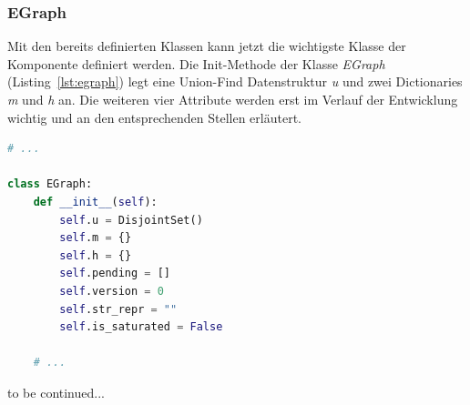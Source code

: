 \subsubsection{EGraph}

Mit den bereits definierten Klassen kann jetzt die wichtigste Klasse der Komponente definiert werden. Die Init-Methode der Klasse \textit{EGraph} (Listing~\ref{lst:egraph})
legt eine Union-Find Datenstruktur \textit{u} und zwei Dictionaries \textit{m} und \textit{h} an. Die weiteren vier Attribute werden erst im Verlauf der Entwicklung wichtig und 
an den entsprechenden Stellen erläutert.

\begin{lstlisting}[language=Python, caption=Auszug aus der Klasse \textit{EGraph}, label={lst:egraph}]
# ... 

class EGraph:
    def __init__(self):
        self.u = DisjointSet()
        self.m = {}
        self.h = {}
        self.pending = []
        self.version = 0
        self.str_repr = ""
        self.is_saturated = False

    # ...
\end{lstlisting} 

to be continued...




